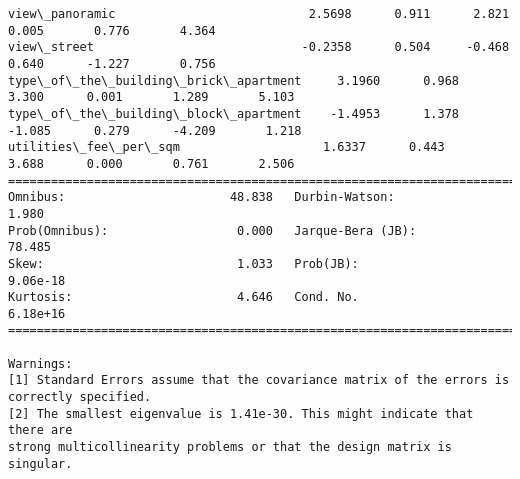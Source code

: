 \documentclass[11pt]{article}
\begin{document}
\begin{Verbatim}[commandchars=\\\{\}]
view\_panoramic                           2.5698      0.911      2.821      0.005       0.776       4.364
view\_street                             -0.2358      0.504     -0.468      0.640      -1.227       0.756
type\_of\_the\_building\_brick\_apartment     3.1960      0.968      3.300      0.001       1.289       5.103
type\_of\_the\_building\_block\_apartment    -1.4953      1.378     -1.085      0.279      -4.209       1.218
utilities\_fee\_per\_sqm                    1.6337      0.443      3.688      0.000       0.761       2.506
==============================================================================
Omnibus:                       48.838   Durbin-Watson:                   1.980
Prob(Omnibus):                  0.000   Jarque-Bera (JB):               78.485
Skew:                           1.033   Prob(JB):                     9.06e-18
Kurtosis:                       4.646   Cond. No.                     6.18e+16
==============================================================================

Warnings:
[1] Standard Errors assume that the covariance matrix of the errors is correctly specified.
[2] The smallest eigenvalue is 1.41e-30. This might indicate that there are
strong multicollinearity problems or that the design matrix is singular.

    \end{Verbatim}
\end{document}
